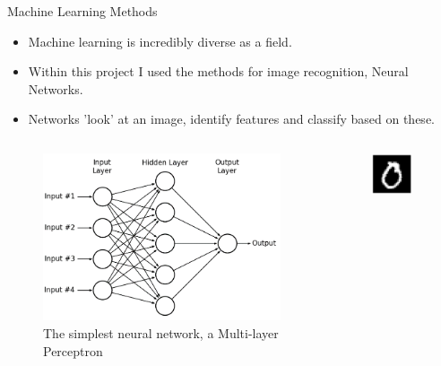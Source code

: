 \documentclass{beamer}
\begin{document}
\begin{frame}{Machine Learning Methods}
    \begin{block}{}
    \begin{itemize}
        \item Machine learning is incredibly diverse as a field.
        \item Within this project I used the methods for image recognition, Neural Networks.
        \item Networks 'look' at an image, identify features and classify based on these.
    \end{itemize}
    \end{block}
    \begin{columns}
    \begin{column}{0.5\textwidth}
    \begin{figure}
        \centering
        \includegraphics[width=\textwidth, height=0.4\textheight]{Figures/MLP.png}
        \caption{The simplest neural network, a Multi-layer Perceptron}
        \label{fig:MLP}
    \end{figure}
    \end{column}
    \begin{column}{0.5\textwidth}
    \begin{figure}
        \centering
        \includegraphics[width=0.8\textwidth, height=0.4\textheight]{Figures/MNIST_44_0.png}

\end{figure}
\end{column}
\end{columns}
\end{frame}
\end{document}
